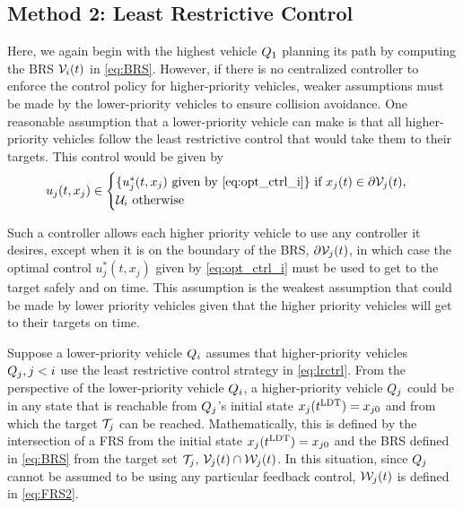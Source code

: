 \subsection{Method 2: Least Restrictive Control \label{sec:lrc}}
Here, we again begin with the highest vehicle $Q_1$ planning its path by computing the BRS $\mathcal{V}_i(t)$ in \eqref{eq:BRS}. However, if there is no centralized controller to enforce the control policy for higher-priority vehicles, weaker assumptions must be made by the lower-priority vehicles to ensure collision avoidance. One reasonable assumption that a lower-priority vehicle can make is that all higher-priority vehicles follow the least restrictive control that would take them to their targets. This control would be given by 
\vspace{-0.4em}
\begin{equation}
\label{eq:lrctrl} %
u_j(t, x_j)\in \begin{cases} \{u_j^*(t, x_j) \text{ given by } \eqref{eq:opt_ctrl_i}\} \text{ if } x_j(t)\in \partial \brs_j(t), \\
\cset_i  \text{ otherwise}
\end{cases}
\end{equation}

Such a controller allows each higher priority vehicle to use any controller it desires, except when it is on the boundary of the BRS, $\partial \mathcal{V}_j(t)$, in which case the optimal control $u_j^*(t, x_j)$ given by \eqref{eq:opt_ctrl_i} must be used to get to the target safely and on time. This assumption is the weakest assumption that could be made by lower priority vehicles given that the higher priority vehicles will get to their targets on time.

Suppose a lower-priority vehicle $Q_i$ assumes that higher-priority vehicles $Q_j, j < i$ use the least restrictive control strategy in \eqref{eq:lrctrl}. From the perspective of the lower-priority vehicle $Q_i$, a higher-priority vehicle $Q_j$ could be in any state that is reachable from $Q_j$'s initial state $x_j(t^\text{LDT}) = x_{j0}$ and from which the target $\mathcal{T}_j$ can be reached. Mathematically, this is defined by the intersection of a FRS from the initial state $x_j(t^\text{LDT})=x_{j0}$ and the BRS defined in \eqref{eq:BRS} from the target set $\mathcal{T}_j$, $\mathcal{V}_j(t) \cap \mathcal{W}_j(t)$. In this situation, since $Q_j$ cannot be assumed to be using any particular feedback control, $\mathcal{W}_j(t)$ is defined in \eqref{eq:FRS2}.
\vspace{-0.4em}

